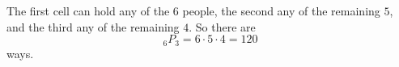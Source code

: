 The first cell can hold any of the $6$ people, the second any of the remaining $5$, and the third any of the remaining $4$. So there are
\[
{}_6P_3=6\cdot5\cdot4=\boxed{120}
\]
ways.
